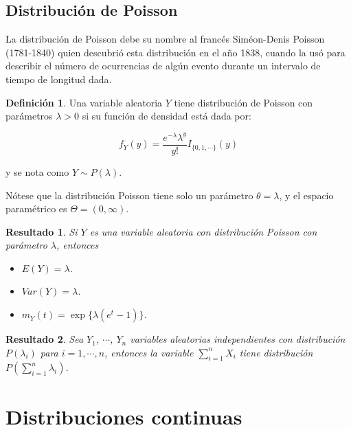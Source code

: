 \documentclass[
  10pt,
  spanish,
]{book}
\providecommand{\tightlist}{%
  \setlength{\itemsep}{0pt}\setlength{\parskip}{0pt}}
\newtheorem{proposition}{Resultado}[chapter]
\theoremstyle{definition}
\newtheorem{definition}{Definición}[chapter]
\theoremstyle{definition}
\theoremstyle{definition}
\theoremstyle{definition}
\theoremstyle{remark}
\begin{document}
\hypertarget{distribuciuxf3n-de-poisson}{%
\subsection{Distribución de Poisson}\label{distribuciuxf3n-de-poisson}}

La distribución de Poisson debe su nombre al francés Siméon-Denis Poisson (1781-1840) quien descubrió esta distribución en el año 1838, cuando
la usó para describir el número de ocurrencias de algún evento durante un intervalo de tiempo de longitud dada.

\begin{definition}
\protect\hypertarget{def:unnamed-chunk-13}{}{\label{def:unnamed-chunk-13} }Una variable aleatoria \(Y\) tiene distribución de Poisson con parámetros \(\lambda>0\) si su función de densidad está dada por:

\begin{equation}
f_Y(y)=\frac{e^{-\lambda}\lambda^y}{y!}I_{\{0,1,\cdots\}}(y)
\end{equation}

y se nota como \(Y\sim P(\lambda)\).
\end{definition}

Nótese que la distribución Poisson tiene solo un parámetro \(\theta=\lambda\), y el espacio paramétrico es \(\Theta=(0,\infty)\).

\begin{proposition}
\protect\hypertarget{prp:unnamed-chunk-14}{}{\label{prp:unnamed-chunk-14} }Si \(Y\) es una variable aleatoria con distribución Poisson con parámetro \(\lambda\), entonces

\begin{itemize}
\tightlist
\item
  \(E(Y)=\lambda\).
\item
  \(Var(Y)=\lambda\).
\item
  \(m_Y(t)=\exp\{\lambda(e^t-1)\}\).
\end{itemize}
\end{proposition}

\begin{proposition}
\protect\hypertarget{prp:unnamed-chunk-15}{}{\label{prp:unnamed-chunk-15} }Sea \(Y_1\), \(\cdots\), \(Y_n\) variables aleatorias independientes con distribución \(P(\lambda_i)\) para \(i=1,\cdots,n\), entonces la variable \(\sum_{i=1}^nX_i\) tiene distribución \(P(\sum_{i=1}^n\lambda_i)\).
\end{proposition}

\hypertarget{distribuciones-continuas}{%
\section{Distribuciones continuas}\label{distribuciones-continuas}}
\end{document}
